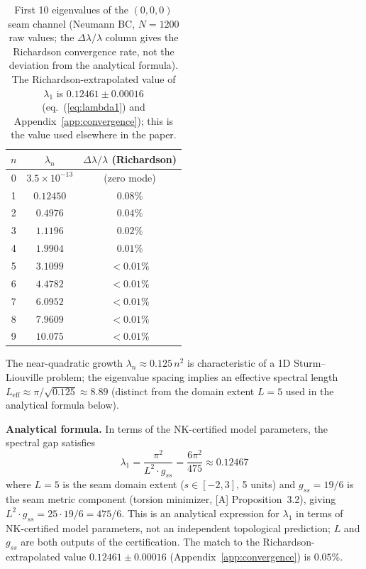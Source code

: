 \documentclass[11pt,a4paper]{article}
\begin{document}
\begin{table}[ht]
\centering
\begin{tabular}{ccc}
\toprule
$n$ & $\lambda_n$ & $\Delta\lambda/\lambda$ (Richardson) \\
\midrule
0 & $3.5 \times 10^{-13}$ & (zero mode) \\
1 & $0.12450$ & $0.08\%$ \\
2 & $0.4976$ & $0.04\%$ \\
3 & $1.1196$ & $0.02\%$ \\
4 & $1.9904$ & $0.01\%$ \\
5 & $3.1099$ & $<0.01\%$ \\
6 & $4.4782$ & $<0.01\%$ \\
7 & $6.0952$ & $<0.01\%$ \\
8 & $7.9609$ & $<0.01\%$ \\
9 & $10.075$ & $<0.01\%$ \\
\bottomrule
\end{tabular}
\caption{First 10 eigenvalues of the $(0,0,0)$ seam channel (Neumann BC, $N=1200$ raw values; the $\Delta\lambda/\lambda$ column gives the Richardson convergence rate, not the deviation from the analytical formula). The Richardson-extrapolated value of $\lambda_1$ is $0.12461 \pm 0.00016$ (eq.~(\ref{eq:lambda1}) and Appendix~\ref{app:convergence}); this is the value used elsewhere in the paper.}
\label{tab:evals}
\end{table}

The near-quadratic growth $\lambda_n \approx 0.125\, n^2$ is characteristic of a 1D Sturm--Liouville problem; the eigenvalue spacing implies an effective spectral length $L_{\mathrm{eff}} \approx \pi/\sqrt{0.125} \approx 8.89$ (distinct from the domain extent $L = 5$ used in the analytical formula below).

\textbf{Analytical formula.} In terms of the NK-certified model parameters, the spectral gap satisfies
\begin{equation}
\lambda_1 = \frac{\pi^2}{L^2 \cdot g_{ss}} = \frac{6\pi^2}{475} \approx 0.12467
\end{equation}
where $L = 5$ is the seam domain extent ($s \in [-2, 3]$, 5 units) and $g_{ss} = 19/6$ is the seam metric component (torsion minimizer, [A] Proposition~3.2), giving $L^2 \cdot g_{ss} = 25 \cdot 19/6 = 475/6$. This is an analytical expression for $\lambda_1$ in terms of NK-certified model parameters, not an independent topological prediction; $L$ and $g_{ss}$ are both outputs of the certification. The match to the Richardson-extrapolated value $0.12461 \pm 0.00016$ (Appendix~\ref{app:convergence}) is $0.05\%$.
\end{document}
